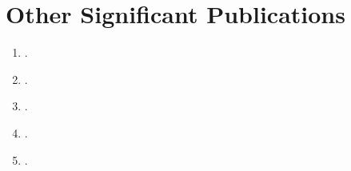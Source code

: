 \section*{Other Significant Publications}
\vspace*{-1ex}
\begin{enumerate}
    \item{}.
    \item{}.
    \item{}.
    \item{}.
    \item{}.
\end{enumerate}


